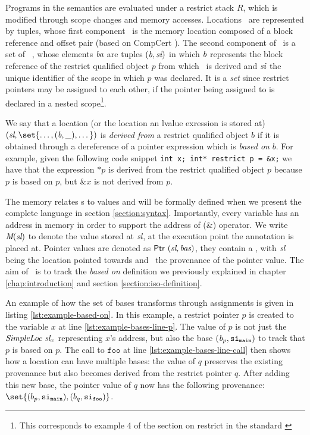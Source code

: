 Programs in the \cink{} semantics are evaluated under a restrict stack $R$, which is modified through scope changes 
and memory accesses.
Locations \Locvar \ are represented by tuples, whose first component \Simplelocvar \
is the memory location composed of a block reference and offset pair (based on CompCert \cite{leroy2012compcert}).
The second component of \Locvar \ is a set of \Bases \
\Basesvar, whose elements $\textit{ba}$ are tuples $(\textit{b}, \textit{si})$ in which $\textit{b}$ represents the block reference
of the restrict qualified object $p$
from which \Locvar \ is derived and $\textit{si}$ the unique identifier of the scope in which $p$ was declared.
It is a \textit{set} since restrict pointers may be assigned to each other, if the pointer being assigned to is declared in a nested scope\footnote{This corresponds to example 4 of the section on restrict in the standard \cite[6.7.3.1]{ISO:2018:III}}.

We say that a location (or the location an lvalue exression is stored at) $(\Simplelocvar, \set{\dots, (\Blockvar, \_), \dots})$
is \textit{derived from} a restrict qualified object $b$ if it is obtained through 
a dereference of a pointer expression which is \textit{based on} $b$.
For example, given the following code snippet \texttt{int x; int* restrict p = &x;} we have that the expression $*p$ is
derived from the restrict qualified object $p$ because $p$ is based on $p$, but $\&x$ is not derived from $p$.

The memory relates \Simpleloc s to values and will be formally defined when we present the complete
language in section \ref{section:syntax}.
Importantly, every variable has an address in memory in order to support the address of (\&) operator.
We write $\textit{M}(\textit{sl})$ to denote the value stored at $\textit{sl}$, at the execution point
the annotation is placed at.
Pointer values are denoted as $\mathsf{Ptr} \ (\textit{sl}, \textit{bas})$, \ie they contain a \Loc, with $\textit{sl}$ being
the location pointed towards and \Basesvar \ the provenance of the pointer value.
The aim of \Basesvar \ is to track the \textit{based on} definition we previously explained in chapter \ref{chap:introduction} and section \ref{section:iso-definition}.

An example of how the set of bases transforms through assignments is given in listing \ref{lst:example-based-on}.
In this example, a restrict pointer $p$ is created to the variable $x$ at line \ref{lst:example-bases-line-p}.
The value of $p$ is not just the $\Simpleloc \ \Simplelocvar_x $ representing $x$'s address,
but also the base $(\textit{b}_p, \mathtt{si}_\mathtt{main})$ to track that $p$ is based on $p$.
The call to $\mathtt{foo}$ at line \ref{lst:example-bases-line-call} then shows how a location can have multiple bases: the value of $q$ preserves the existing provenance but also becomes derived from the restrict pointer $q$.
After adding this new base, the pointer value of $q$ now has the following provenance: $\set{(b_p, \scope{main}), (b_q, \scope{foo})}$.


